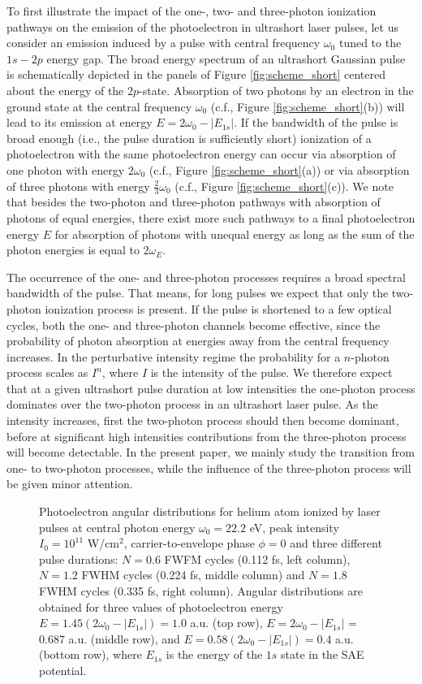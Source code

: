 To first illustrate the impact of the one-, two- and three-photon ionization pathways on the emission of the photoelectron in ultrashort laser pulses, let us consider an emission induced by a pulse with central frequency $\omega_0$ tuned to the $1s-2p$ energy gap. The broad energy spectrum of an ultrashort Gaussian pulse is schematically depicted in the panels of Figure \ref{fig:scheme_short} centered about the energy of the $2p$-state. Absorption of two photons by an electron in the ground state at the central frequency $\omega_0$ (c.f., Figure \ref{fig:scheme_short}(b)) will lead to its emission at energy $E = 2\omega_0 - |E_{1s}|$. If the bandwidth of the pulse is broad enough (i.e., the pulse duration is sufficiently short) ionization of a photoelectron with the same photoelectron energy can occur via absorption of one photon with energy $2 \omega_0$ (c.f., Figure \ref{fig:scheme_short}(a)) or via absorption of three photons with energy $\frac{2}{3} \omega_0$ (c.f., Figure \ref{fig:scheme_short}(c)). We note that besides the two-photon and three-photon pathways with absorption of photons of equal energies, there exist more such pathways to a final photoelectron energy $E$ for absorption of photons with unequal energy as long as the sum of the photon energies is equal to $2 \omega_E$.

The occurrence of the one- and three-photon processes requires a broad spectral bandwidth of the pulse. That means, for long pulses we expect that only the two-photon ionization process is present. If the pulse is shortened to a few optical cycles, both the one- and three-photon channels become effective, since the probability of photon absorption at energies away from the central frequency increases. In the perturbative intensity regime the probability for a $n$-photon process scales as $I^n$, where $I$ is the intensity of the pulse. We therefore expect that at a given ultrashort pulse duration at low intensities the one-photon process dominates over the two-photon process in an ultrashort laser pulse. As the intensity increases, first the two-photon process should then become dominant, before at significant high intensities contributions from the three-photon process will become detectable. In the present paper, we mainly study the transition from one- to two-photon processes, while the influence of the three-photon process will be given minor attention. 

\begin{figure}[t]
\centering
\caption{
Photoelectron angular distributions for helium atom ionized by laser pulses at central photon energy $\omega_0 = 22.2$ eV, peak intensity $I_0 = 10^{11}$ W/cm$^2$, carrier-to-envelope phase $\phi = 0$ and three different pulse durations: $N = 0.6$ FWFM cycles (0.112 fs, left column), $N = 1.2$ FWHM cycles (0.224 fs, middle column) and $N = 1.8$ FWHM cycles (0.335 fs, right column). Angular distributions are obtained for three values of photoelectron energy $E = 1.45(2\omega_0 - |E_{1s}|) = 1.0$ a.u. (top row), $E = 2\omega_0 - |E_{1s}|$ = 0.687 a.u. (middle row), and $E = 0.58(2\omega_0 - |E_{1s}|) = 0.4$ a.u. (bottom row), where $E_{1s}$ is the energy of the $1s$ state in the SAE potential.
} 
  \label{fig:pads}
\end{figure}

